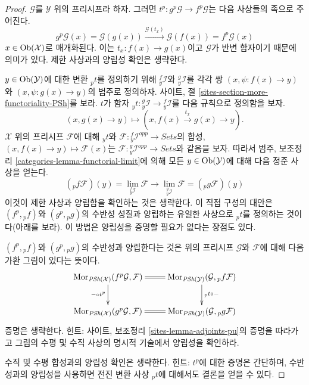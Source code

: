 \begin{proof}
$\mathcal{G}$를 $\mathcal{Y}$ 위의 프리시프라 하자. 그러면
$t^p : g^p\mathcal{G} \to f^p\mathcal{G}$는 다음 사상들의 족으로
주어진다.
$$
g^p\mathcal{G}(x) = \mathcal{G}(g(x))
\xrightarrow{\mathcal{G}(t_x)}
\mathcal{G}(f(x)) = f^p\mathcal{G}(x)
$$
$x \in \mathop{\mathrm{Ob}}\nolimits(\mathcal{X})$로 매개화된다. 이는
$t_x : f(x) \to g(x)$이고 $\mathcal{G}$가 반변 함자이기 때문에
의미가 있다. 제한 사상과의 양립성 확인은 생략한다.

\medskip\noindent
$y \in \mathop{\mathrm{Ob}}\nolimits(\mathcal{Y})$에 대한 변환 ${}_pt$를 정의하기 위해
${}_y^f\mathcal{I}$와 ${}_y^g\mathcal{I}$를 각각
쌍 $(x, \psi : f(x) \to y)$와 $(x, \psi : g(x) \to y)$의 범주로 정의하자.
사이트, 절 \ref{sites-section-more-functoriality-PSh}를 보라.
$t$가 함자
${}_yt : {}_y^g\mathcal{I} \to {}_y^f\mathcal{I}$를
다음 규칙으로 정의함을 보자.
$$
(x, g(x) \to y) \longmapsto (x, f(x) \xrightarrow{t_x} g(x) \to y).
$$
$\mathcal{X}$ 위의 프리시프 $\mathcal{F}$에 대해
${}_yt$와 $\mathcal{F} : {}_y^f\mathcal{I}^{opp} \to \textit{Sets}$의 합성,
$(x, f(x) \to y) \mapsto \mathcal{F}(x)$는
$\mathcal{F} : {}_y^g\mathcal{I}^{opp} \to \textit{Sets}$와 같음을 보자.
따라서 범주, 보조정리 \ref{categories-lemma-functorial-limit}에 의해
모든 $y \in \mathop{\mathrm{Ob}}\nolimits(\mathcal{Y})$에 대해 다음 정준 사상을 얻는다.
$$
({}_pf\mathcal{F})(y) = \lim_{{}_y^f\mathcal{I}} \mathcal{F}
\longrightarrow
\lim_{{}_y^g\mathcal{I}} \mathcal{F} = ({}_pg\mathcal{F})(y)
$$
이것이 제한 사상과 양립함을 확인하는 것은 생략한다. 이 직접 구성의
대안은 $(f^p, {}_pf)$와 $(g^p, {}_pg)$의 수반성 성질과 양립하는
유일한 사상으로 ${}_pt$를 정의하는 것이다(아래를 보라).
이 방법은 양립성을 증명할 필요가 없다는 장점도 있다.

\medskip\noindent
$(f^p, {}_pf)$와 $(g^p, {}_pg)$의 수반성과 양립한다는 것은 위의
프리시프 $\mathcal{G}$와 $\mathcal{F}$에 대해 다음 가환 그림이
있다는 뜻이다.
$$
\xymatrix{
\Mor_{\textit{PSh}(\mathcal{X})}(f^p\mathcal{G}, \mathcal{F})
\ar@{=}[r] \ar[d]_{- \circ t^p} &
\Mor_{\textit{PSh}(\mathcal{Y})}(\mathcal{G}, {}_pf\mathcal{F})
\ar[d]^{{}_pt \circ -} \\
\Mor_{\textit{PSh}(\mathcal{X})}(g^p\mathcal{G}, \mathcal{F})
\ar@{=}[r] &
\Mor_{\textit{PSh}(\mathcal{Y})}(\mathcal{G}, {}_pg\mathcal{F})
}
$$
증명은 생략한다. 힌트: 사이트, 보조정리
\ref{sites-lemma-adjoints-pu}의 증명을 따라가고 그림의 수평 및
수직 사상의 명시적 기술에서 양립성을 확인하라.

\medskip\noindent
수직 및 수평 합성과의 양립성 확인은 생략한다. 힌트: $t^p$에 대한
증명은 간단하며, 수반성과의 양립성을 사용하면 전진 변환 사상
${}_pt$에
대해서도 결론을 얻을 수 있다.
\end{proof}







